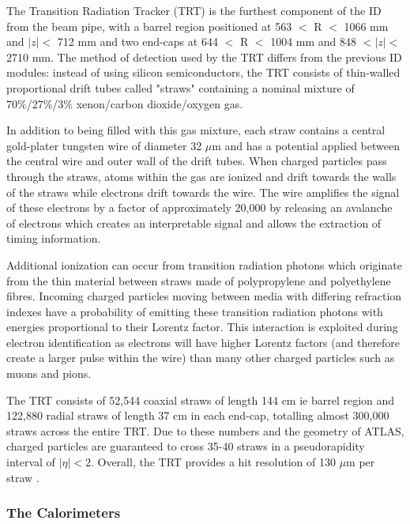 \documentclass[12pt,a4paper,epsf,portrait,times,epsfig]{article}
\begin{document}
		The Transition Radiation Tracker (TRT) \cite{ATLASTRT} is the furthest component of the ID from the beam pipe, with a barrel region positioned at 563 $<$ R $<$ 1066 mm and $|z| <$ 712 mm and two end-caps at 644 $<$ R $<$ 1004 mm and 848 $< |z| <$ 2710 mm. The method of detection used by the TRT differs from the previous ID modules: instead of using silicon semiconductors, the TRT consists of thin-walled proportional drift tubes called "straws" containing a nominal mixture of 70\%/27\%/3\% xenon/carbon dioxide/oxygen gas. \par 

		In addition to being filled with this gas mixture, each straw contains a central gold-plater tungsten wire of diameter 32 $\mu$m and has a potential applied between the central wire and outer wall of the drift tubes. When charged particles pass through the straws, atoms within the gas are ionized and drift towards the walls of the straws while electrons drift towards the wire. The wire amplifies the signal of these electrons by a factor of approximately 20,000 by releasing an avalanche of electrons which creates an interpretable signal and allows the extraction of timing information. \par

		Additional ionization can occur from transition radiation photons which originate from the thin material between straws made of polypropylene and polyethylene fibres. Incoming charged particles moving between media with differing refraction indexes have a probability of emitting these transition radiation photons with energies proportional to their Lorentz factor. This interaction is exploited during electron identification as electrons will have higher Lorentz factors (and therefore create a larger pulse within the wire) than many other charged particles such as muons and pions. \par

		The TRT consists of 52,544 coaxial straws of length 144 cm ie barrel region and 122,880 radial straws of length 37 cm in each end-cap, totalling almost 300,000 straws across the entire TRT. Due to these numbers and the geometry of ATLAS, charged particles are guaranteed to cross 35-40 straws in a pseudorapidity interval of $|\eta| < 2$. Overall, the TRT provides a hit resolution of 130 $\mu$m per straw \cite{ATLASTRTRes}. 

		\subsubsection{The Calorimeters}\label{Section:Calorimeters}
\end{document}
